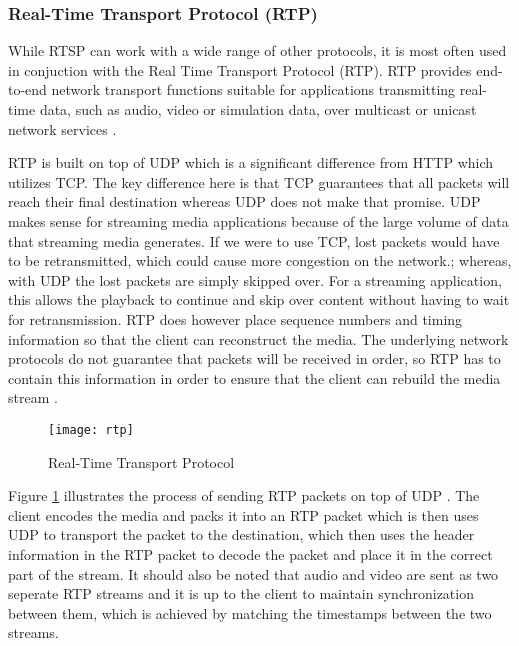 \documentclass[12pt]{article}
\begin{document}
\subsubsection{Real-Time Transport Protocol (RTP)}
While RTSP can work with a wide range of other protocols, it is most often used in conjuction with the Real Time Transport Protocol (RTP).  RTP provides end-to-end network transport functions suitable for applications transmitting real-time data, such as audio, video or simulation data, over multicast or unicast network services \cite{schulzrinne_casner_frederick_jacobson_2003}.

RTP is built on top of UDP which is a significant difference from HTTP which utilizes TCP.  The key difference here is that TCP guarantees that all packets will reach their final destination whereas UDP does not make that promise.  UDP makes sense for streaming media applications because of the large volume of data that streaming media generates.  If we were to use TCP, lost packets would have to be retransmitted, which could cause more congestion on the network.; whereas, with UDP the lost packets are simply skipped over.  For a streaming application, this allows the playback to continue and skip over content without having to wait for retransmission.  RTP does however place sequence numbers and timing information so that the client can reconstruct the media.  The underlying network protocols do not guarantee that packets will be received in order, so RTP has to contain this information in order to ensure that the client can rebuild the media stream \cite{schulzrinne_casner_frederick_jacobson_2003}.

\begin{figure}[htb]
  \begin{center}
    \texttt{[image: rtp]}
    \caption{Real-Time Transport Protocol}
    \label{fig:rtp}
  \end{center}
\end{figure}

Figure \ref{fig:rtp} illustrates the process of sending RTP packets on top of UDP \cite{zurawski_2005}.  The client encodes the media and packs it into an RTP packet which is then uses UDP to transport the packet to the destination, which then uses the header information in the RTP packet to decode the packet and place it in the correct part of the stream. It should also be noted that audio and video are sent as two seperate RTP streams and it is up to the client to maintain synchronization between them, which is achieved by matching the timestamps between the two streams.
\end{document}
